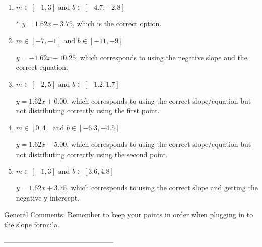 \documentclass{extbook}[14pt]
\begin{document}
\begin{enumerate}[label=\Alph*.] 
\item $ m \in [-1, 3] \text{ and } b \in [-4.7, -2.8] $ 

 * $y = 1.62x - 3.75$, which is the correct option. 
\item $ m \in [-7, -1] \text{ and } b \in [-11, -9] $ 

  $y = -1.62x - 10.25$, which corresponds to using the negative slope and the correct equation. 
\item $ m \in [-2, 5] \text{ and } b \in [-1.2, 1.7] $ 

  $y = 1.62x + 0.00$, which corresponds to using the correct slope/equation but not distributing correctly using the first point. 
\item $ m \in [0, 4] \text{ and } b \in [-6.3, -4.5] $ 

  $y = 1.62x - 5.00$, which corresponds to using the correct slope/equation but not distributing correctly using the second point. 
\item $ m \in [-1, 3] \text{ and } b \in [3.6, 4.8] $ 

  $y = 1.62x + 3.75$, which corresponds to using the correct slope and getting the negative y-intercept. 
\end{enumerate} 
 
General Comments: Remember to keep your points in order when plugging in to the slope formula.

-----------------------------------------------
\end{document}
